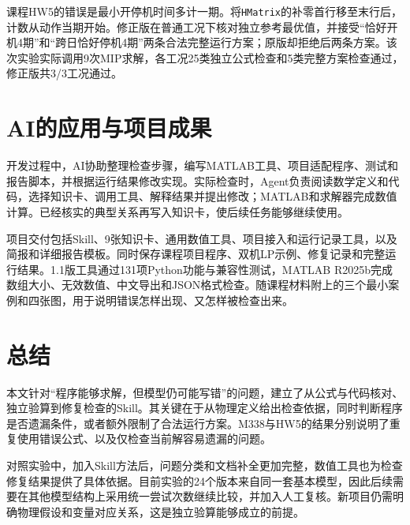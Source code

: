 \documentclass[chinese]{iarticle}
\begin{document}
课程HW5的错误是最小开停机时间多计一期。将\texttt{HMatrix}的补零首行移至末行后，计数从动作当期开始。修正版在普通工况下核对独立参考最优值，并接受“恰好开机4期”和“跨日恰好停机4期”两条合法完整运行方案；原版却拒绝后两条方案。该次实验实际调用9次MIP求解，各工况25类独立公式检查和5类完整方案检查通过，修正版共3/3工况通过\cite{hw5}。

\section{AI的应用与项目成果}

开发过程中，AI协助整理检查步骤，编写MATLAB工具、项目适配程序、测试和报告脚本，并根据运行结果修改实现。实际检查时，Agent负责阅读数学定义和代码，选择知识卡、调用工具、解释结果并提出修改；MATLAB和求解器完成数值计算。已经核实的典型关系再写入知识卡，使后续任务能够继续使用。

项目交付包括Skill、9张知识卡、通用数值工具、项目接入和运行记录工具，以及简报和详细报告模板。同时保存课程项目程序、双机LP示例、修复记录和完整运行结果。1.1版工具通过131项Python功能与兼容性测试，MATLAB R2025b完成数组大小、无效数值、中文导出和JSON格式检查\cite{release}。随课程材料附上的三个最小案例和四张图，用于说明错误怎样出现、又怎样被检查出来。

\newpage
\section{总结}

本文针对“程序能够求解，但模型仍可能写错”的问题，建立了从公式与代码核对、独立验算到修复检查的Skill。其关键在于从物理定义给出检查依据，同时判断程序是否遗漏条件，或者额外限制了合法运行方案。M338与HW5的结果分别说明了重复使用错误公式、以及仅检查当前解容易遗漏的问题。

对照实验中，加入Skill方法后，问题分类和文档补全更加完整，数值工具也为检查修复结果提供了具体依据。目前实验的24个版本来自同一套基本模型，因此后续需要在其他模型结构上采用统一尝试次数继续比较，并加入人工复核。新项目仍需明确物理假设和变量对应关系，这是独立验算能够成立的前提。
\end{document}
